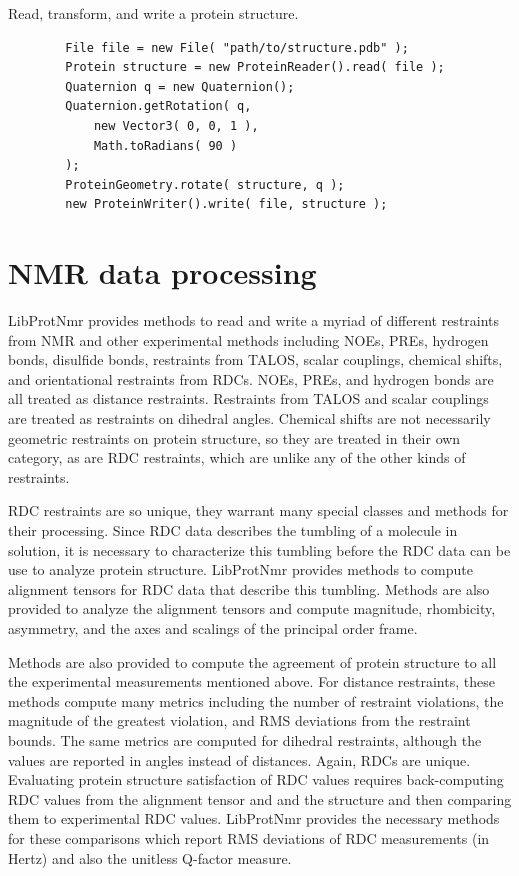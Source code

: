 \documentclass[11pt]{article}
\newcommand{\software}[1]{{\sc #1}}
\newenvironment{codesample}
{
\begin{codesamplefloat}
\centering
\RecustomVerbatimEnvironment{Verbatim}{BVerbatim}{}
\vspace{0.1in}
}{
\end{codesamplefloat}
}
\newcommand{\libprotnmr}{\software{LibProtNmr}}
\begin{document}
\begin{codesample}
	\caption{
		Read, transform, and write a protein structure.
	}
	\begin{verbatim}
		File file = new File( "path/to/structure.pdb" );
		Protein structure = new ProteinReader().read( file );
		Quaternion q = new Quaternion();
		Quaternion.getRotation( q,
			new Vector3( 0, 0, 1 ),
			Math.toRadians( 90 )
		);
		ProteinGeometry.rotate( structure, q );
		new ProteinWriter().write( file, structure );
	\end{verbatim}
	\label{code:readWrite}
\end{codesample}


\section{NMR data processing}

{\libprotnmr} provides methods to read and write a myriad of different restraints from NMR and other experimental methods including NOEs, PREs, hydrogen bonds, disulfide bonds, restraints from TALOS, scalar couplings, chemical shifts, and orientational restraints from RDCs. NOEs, PREs, and hydrogen bonds are all treated as distance restraints. Restraints from TALOS and scalar couplings are treated as restraints on dihedral angles. Chemical shifts are not necessarily geometric restraints on protein structure, so they are treated in their own category, as are RDC restraints, which are unlike any of the other kinds of restraints.

RDC restraints are so unique, they warrant many special classes and methods for their processing. Since RDC data describes the tumbling of a molecule in solution, it is necessary to characterize this tumbling before the RDC data can be use to analyze protein structure. {\libprotnmr} provides methods to compute alignment tensors for RDC data that describe this tumbling. Methods are also provided to analyze the alignment tensors and compute magnitude, rhombicity, asymmetry, and the axes and scalings of the principal order frame.

Methods are also provided to compute the agreement of protein structure to all the experimental measurements mentioned above. For distance restraints, these methods compute many metrics including the number of restraint violations, the magnitude of the greatest violation, and RMS deviations from the restraint bounds. The same metrics are computed for dihedral restraints, although the values are reported in angles instead of distances. Again, RDCs are unique. Evaluating protein structure satisfaction of RDC values requires back-computing RDC values from the alignment tensor and and the structure and then comparing them to experimental RDC values. {\libprotnmr} provides the necessary methods for these comparisons which report RMS deviations of RDC measurements (in Hertz) and also the unitless Q-factor measure.
\end{document}

